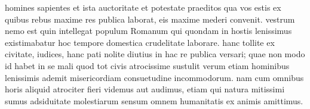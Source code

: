  homines sapientes et ista auctoritate et potestate praeditos qua vos estis ex quibus rebus maxime res publica laborat, eis maxime mederi convenit. vestrum nemo est quin intellegat populum Romanum qui quondam in hostis lenissimus existimabatur hoc tempore domestica crudelitate laborare. hanc tollite ex civitate, iudices, hanc pati nolite diutius in hac re publica versari; quae non modo id habet in se mali quod tot civis atrocissime sustulit verum etiam hominibus lenissimis ademit misericordiam consuetudine incommodorum. nam cum omnibus horis aliquid atrociter fieri videmus aut audimus, etiam qui natura mitissimi sumus adsiduitate molestiarum sensum omnem humanitatis ex animis amittimus.
